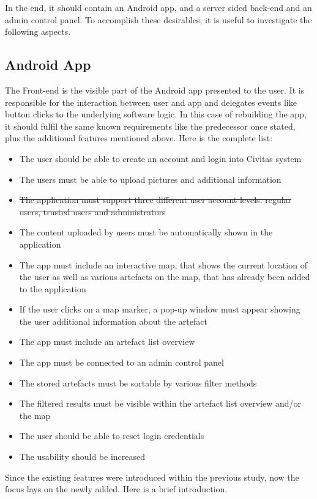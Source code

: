 In the end, it should contain an Android app, and a server sided back-end and an admin control panel.
To accomplish these desirables, it is useful to investigate the following aspects.

\subsection{Android App}
The Front-end is the visible part of the Android app presented to the user. It is responsible for the interaction between user and app and delegates events like button clicks to the underlying software logic. In this case of rebuilding the app, it should fulfil the same known requirements like the predecessor once stated, plus the additional features mentioned above. Here is the complete list:

\begin{itemize}
\item The user should be able to create an account and login into Civitas system
\item The users must be able to upload pictures and additional information
\item \sout{The application must support three different user account levels: regular users, trusted users and administrators}
\item The content uploaded by users must be automatically shown in the application
\item The app must include an interactive map, that shows the current location of the user as well as various artefacts on the map, that has already been added to the application
\item If the user clicks on a map marker, a pop-up window must appear showing the user additional information about the artefact
\item The app must include an artefact list overview
\item The app must be connected to an admin control panel
\item The stored artefacts must be sortable by various filter methods
\item The filtered results must be visible within the artefact list overview and/or the map
\item The user should be able to reset login credentials
\item The usability should be increased
\end{itemize}

Since the existing features were introduced within the previous study, now the focus lays on the newly added. Here is a brief introduction. 

